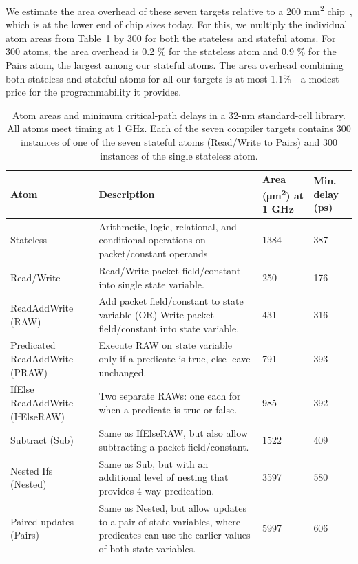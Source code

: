 We estimate the area overhead of these seven targets relative to a 200
\si{\milli\metre\squared} chip~\cite{gibb_parsing}, which is at the lower end
of chip sizes today. For this, we multiply the individual atom areas from
Table~\ref{tab:templates} by 300 for both the stateless and stateful atoms. For
300 atoms, the area overhead is 0.2 \% for the stateless atom and 0.9 \% for
the Pairs atom, the largest among our stateful atoms.  The area overhead
combining both stateless and stateful atoms for all our targets is at most
1.1\%---a modest price for the programmability it provides.
\begin{table}[!t]
  \centering
  \begin{small}
  \begin{tabular}{|p{}|p{}|p{}|p{}|}
    \hline
    Atom & Description & Area (\si{\micro\metre\squared}) at 1 GHz & Min. delay (ps) \\
    \hline
    Stateless & Arithmetic, logic, relational, and conditional operations on packet/constant operands & 1384 & 387 \\
    \hline
    Read/Write & Read/Write packet field/constant into single state variable. & 250 & 176 \\
    \hline
    ReadAddWrite (RAW) & Add packet field/constant to state variable (OR) Write packet field/constant into state variable. & 431 & 316 \\
    \hline
    Predicated ReadAddWrite (PRAW) & Execute RAW on state variable only if a predicate is true, else leave unchanged. & 791 & 393 \\
    \hline
    IfElse ReadAddWrite (IfElseRAW) & Two separate RAWs: one each for when a predicate is true or false. & 985 & 392 \\
    \hline
    Subtract (Sub) & Same as IfElseRAW, but also allow subtracting a packet field/constant. & 1522 & 409 \\
    \hline
    Nested Ifs (Nested) & Same as Sub, but with an additional level of nesting that provides 4-way predication. & 3597 & 580 \\
    \hline
    Paired updates (Pairs) & Same as Nested, but allow updates to a pair of state variables, where predicates can use the earlier values of both state variables. & 5997 & 606 \\
    \hline
  \end{tabular}
  \end{small}
  \caption{Atom areas and minimum critical-path delays in a 32-nm standard-cell
library.  All atoms meet timing at 1 GHz. Each of the seven compiler targets
contains 300 instances of one of the seven stateful atoms (Read/Write to Pairs)
and 300 instances of the single stateless atom.}
  \label{tab:templates}
\end{table}

